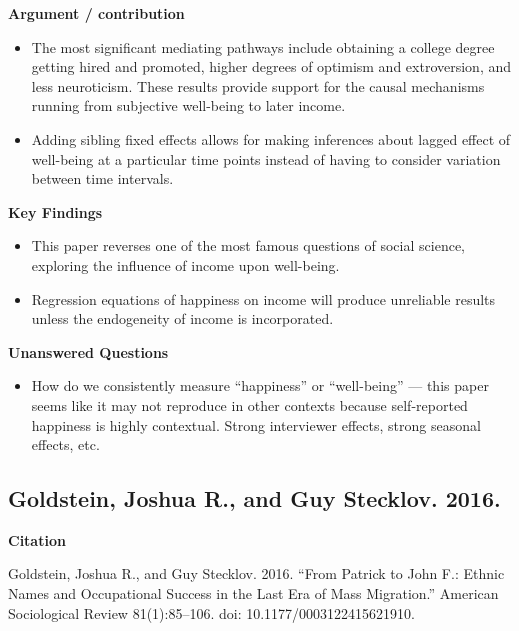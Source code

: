 \documentclass[
]{book}
\providecommand{\tightlist}{%
  \setlength{\itemsep}{0pt}\setlength{\parskip}{0pt}}
\begin{document}
\textbf{Argument / contribution}

\begin{itemize}
\tightlist
\item
  The most significant mediating pathways include obtaining a college degree getting hired and promoted, higher degrees of optimism and extroversion, and less neuroticism. These results provide support for the causal mechanisms running from subjective well-being to later income.
\item
  Adding sibling fixed effects allows for making inferences about lagged effect of well-being at a particular time points instead of having to consider variation between time intervals.
\end{itemize}

\textbf{Key Findings}

\begin{itemize}
\tightlist
\item
  This paper reverses one of the most famous questions of social science, exploring the influence of income upon well-being.
\item
  Regression equations of happiness on income will produce unreliable results unless the endogeneity of income is incorporated.
\end{itemize}

\textbf{Unanswered Questions}

\begin{itemize}
\tightlist
\item
  How do we consistently measure ``happiness'' or ``well-being'' --- this paper seems like it may not reproduce in other contexts because self-reported happiness is highly contextual. Strong interviewer effects, strong seasonal effects, etc.
\end{itemize}

\hypertarget{goldstein-joshua-r.-and-guy-stecklov.-2016.}{%
\subsection*{Goldstein, Joshua R., and Guy Stecklov. 2016.}\label{goldstein-joshua-r.-and-guy-stecklov.-2016.}}

\textbf{Citation}

Goldstein, Joshua R., and Guy Stecklov. 2016. ``From Patrick to John F.: Ethnic Names and Occupational Success in the Last Era of Mass Migration.'' American Sociological Review 81(1):85--106. doi: 10.1177/0003122415621910.
\end{document}
